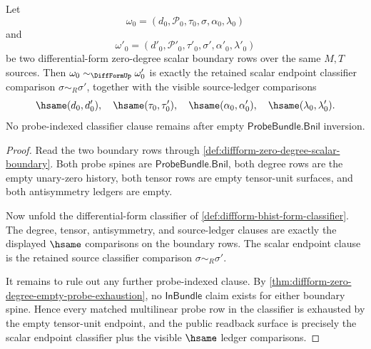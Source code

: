 \begin{theorem}
\label{thm:diffform-zero-degree-scalar-classifier-readback}
Let
$$
\omega_0=(d_0,\mathcal{P}_0,\tau_0,\sigma,\alpha_0,\lambda_0)
$$
and
$$
\omega'_0=(d'_0,\mathcal{P}'_0,\tau'_0,\sigma',\alpha'_0,\lambda'_0)
$$
be two differential-form zero-degree scalar boundary rows over the same
$M,T$ sources. Then $\omega_0\sim_{\DiffFormUp}\omega'_0$ is exactly the
retained scalar endpoint classifier comparison $\sigma\sim_R\sigma'$,
together with the visible source-ledger comparisons
$$
\hsame(d_0,d'_0),\quad
\hsame(\tau_0,\tau'_0),\quad
\hsame(\alpha_0,\alpha'_0),\quad
\hsame(\lambda_0,\lambda'_0).
$$
No probe-indexed classifier clause remains after empty
$\mathsf{ProbeBundle.Bnil}$ inversion.
\end{theorem}
\begin{proof}
Read the two boundary rows through
\autoref{def:diffform-zero-degree-scalar-boundary}. Both probe spines are
$\mathsf{ProbeBundle.Bnil}$, both degree rows are the empty unary-zero
history, both tensor rows are empty tensor-unit surfaces, and both
antisymmetry ledgers are empty.

Now unfold the differential-form classifier of
\autoref{def:diffform-bhist-form-classifier}. The degree, tensor,
antisymmetry, and source-ledger clauses are exactly the displayed $\hsame$
comparisons on the boundary rows. The scalar endpoint clause is the retained
source classifier comparison $\sigma\sim_R\sigma'$.

It remains to rule out any further probe-indexed clause. By
\autoref{thm:diffform-zero-degree-empty-probe-exhaustion}, no
$\mathsf{InBundle}$ claim exists for either boundary spine. Hence every
matched multilinear probe row in the classifier is exhausted by the empty
tensor-unit endpoint, and the public readback surface is precisely the
scalar endpoint classifier plus the visible $\hsame$ ledger comparisons.
\end{proof}

